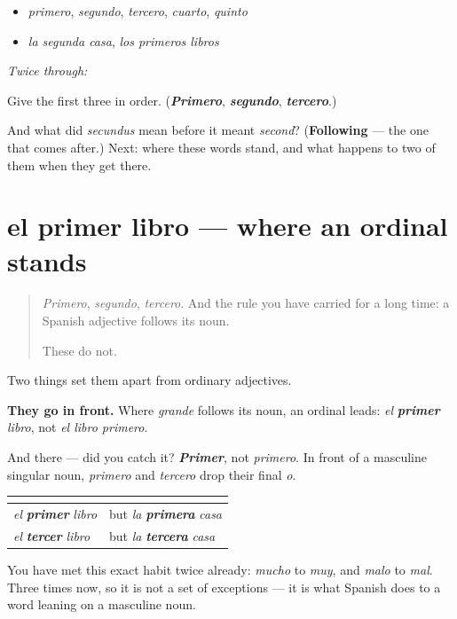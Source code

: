 \begin{itemize}
\raggedright
  \item \emph{primero}, \emph{segundo}, \emph{tercero}, \emph{cuarto}, \emph{quinto}
  \item \emph{la segunda casa}, \emph{los primeros libros}
\end{itemize}

\emph{Twice through:}

\begin{tcolorbox}[breakable,colback=teal!4,colframe=teal!35!black,title={Before you move on}]
Give the first three in order. (\emph{\textbf{Primero}}, \emph{\textbf{segundo}}, \emph{\textbf{tercero}}.)

And what did \emph{secundus} mean before it meant \emph{second}? (\textbf{Following} — the one that comes after.) Next: where these words stand, and what happens to two of them when they get there.
\end{tcolorbox}
\section[el primer libro]{el primer libro — where an ordinal stands}

\label{lesson:ES-C67-primer-libro}



\begin{quote}
\emph{Primero}, \emph{segundo}, \emph{tercero}. And the rule you have carried for a long time: a Spanish adjective follows its noun.

These do not.
\end{quote}

\begin{culture}
Two things set them apart from ordinary adjectives.

\textbf{They go in front.} Where \emph{grande} follows its noun, an ordinal leads: \emph{el} \emph{\textbf{primer}} \emph{libro}, not \emph{el libro primero}.

And there — did you catch it? \emph{\textbf{Primer}}, not \emph{primero}. In front of a masculine singular noun, \emph{primero} and \emph{tercero} drop their final \emph{o}.

\noindent
\begin{tabularx}{\linewidth}{@{}>{\raggedright\arraybackslash}X>{\raggedright\arraybackslash}X@{}}
\toprule
\textbf{} & \textbf{} \\
\midrule
\emph{el} \emph{\textbf{primer}} \emph{libro} & but \emph{la} \emph{\textbf{primera}} \emph{casa} \\
\emph{el} \emph{\textbf{tercer}} \emph{libro} & but \emph{la} \emph{\textbf{tercera}} \emph{casa} \\
\bottomrule
\end{tabularx}

You have met this exact habit twice already: \emph{mucho} to \emph{muy}, and \emph{malo} to \emph{mal}. Three times now, so it is not a set of exceptions — it is what Spanish does to a word leaning on a masculine noun.
\end{culture}

